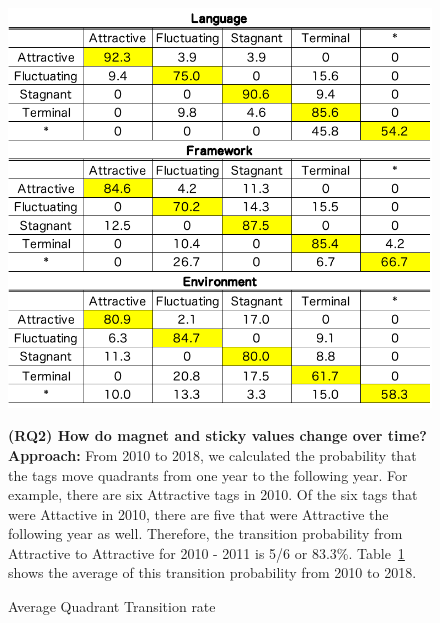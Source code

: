 \documentclass[conference]{IEEEtran}
\begin{document}
\begin{figure}[t]
\begin{oframed}
\begin{table}[t]
 \centering
 \caption{Average Quadrant Transition rate}
 \includegraphics[width=1.0\hsize]{img/averageAFST.pdf} 
 \label{table2} 
\end{table}

\textbf{(RQ2) How do magnet and sticky values change over time?} \\
\smallskip
\textbf{Approach:}
From 2010 to 2018, we calculated the probability that the tags move quadrants from one year to the following year. For example, there are six Attractive tags in 2010. Of the six tags that were Attactive in 2010, there are five that were Attractive the following year as well. Therefore, the transition probability from Attractive to Attractive for 2010 - 2011 is 5/6 or 83.3\%. Table~\ref{table2} shows the average of this transition probability from 2010 to 2018.



\end{oframed}
\end{figure}
\end{document}
